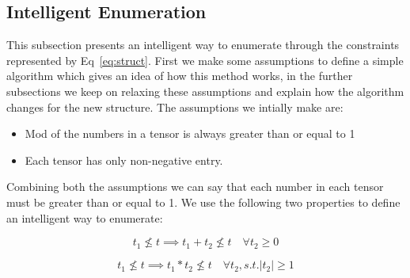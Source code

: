 \documentclass{article}
\begin{document}
\subsection{Intelligent Enumeration}
This subsection presents an intelligent way to enumerate through the constraints represented by Eq~\ref{eq:struct}. First we make some assumptions to define a simple algorithm which gives an idea of how this method works, in the further subsections we keep on relaxing these assumptions and explain how the algorithm changes for the new structure.
The assumptions we intially make are:
\begin{itemize}
\item Mod of the numbers in a tensor is always greater than or equal to 1
\item Each tensor has only non-negative entry.
\end{itemize}
Combining both the assumptions we can say that each number in each tensor must be greater than or equal to 1. We use the following two properties to define an intelligent way to enumerate:

\begin{equation}
t_1 \not\le t \implies t_1 + t_2 \not\le t \quad \forall t_2 \geq 0
\end{equation} 

\begin{equation}
t_1 \not\le t \implies t_1 * t_2 \not\le t \quad \forall t_2, s.t. |t_2| \geq 1
\end{equation} 
\end{document}
